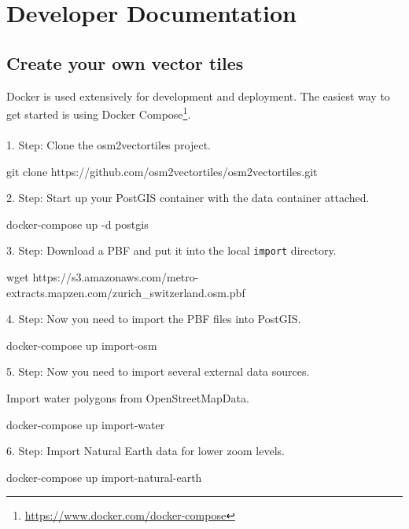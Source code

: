 \chapter{Developer Documentation}

\section*{Create your own vector tiles}

Docker is used extensively for development and deployment. The easiest
way to get started is using
Docker Compose\footnote{\url{https://www.docker.com/docker-compose}}.
\\\\
1. Step: Clone the osm2vectortiles project.

\begin{bashcode}
git clone https://github.com/osm2vectortiles/osm2vectortiles.git
\end{bashcode}

2. Step: Start up your PostGIS container with the data container attached.

\begin{bashcode}
docker-compose up -d postgis
\end{bashcode}

3. Step: Download a PBF and put it into the local \texttt{import} directory.

\begin{bashcode}
wget https://s3.amazonaws.com/metro-extracts.mapzen.com/zurich_switzerland.osm.pbf
\end{bashcode}

4. Step: Now you need to import the PBF files into PostGIS.

\begin{bashcode}
docker-compose up import-osm
\end{bashcode}

5. Step: Now you need to import several external data sources.

Import water polygons from OpenStreetMapData.

\begin{bashcode}
docker-compose up import-water
\end{bashcode}

6. Step: Import Natural Earth data for lower zoom levels.

\begin{bashcode}
docker-compose up import-natural-earth
\end{bashcode}

